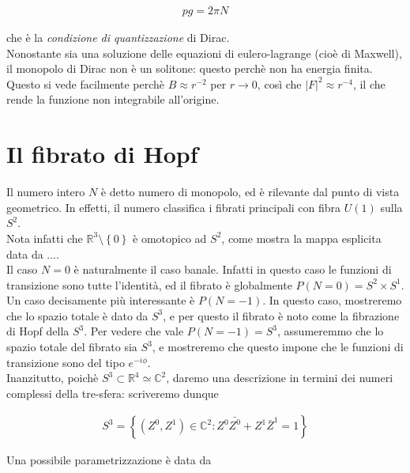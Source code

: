 \documentclass{report}
\begin{document}
\begin{align}
    pg = 2\pi N
\end{align}

che è la \emph{condizione di quantizzazione} di Dirac. \\

Nonostante sia una soluzione delle equazioni di eulero-lagrange (cioè di Maxwell), il monopolo di Dirac non è un solitone: questo perchè non ha energia finita. Questo si vede facilmente perchè \(B \approx r^{-2}\) per \(r \rightarrow 0\), così che \(|F|^2 \approx r^{-4}\), il che rende la funzione non integrabile all'origine. 

\section{Il fibrato di Hopf}

Il numero intero \(N\) è detto numero di monopolo, ed è rilevante dal punto di vista geometrico. In effetti, il numero classifica i fibrati principali con fibra \(U(1)\) sulla \(S^2\). \\

Nota infatti che \(\mathbb{R}^3 \setminus \left\{0\right\}\) è omotopico ad \(S^2\), come mostra la mappa esplicita data da .... \\

Il caso \(N=0\) è naturalmente il caso banale. Infatti in questo caso le funzioni di transizione sono tutte l'identità, ed il fibrato è globalmente \(P(N=0) = S^2 \times S^1\). \\ 

Un caso decisamente più interessante è \(P(N=-1)\). In questo caso, mostreremo che lo spazio totale è dato da  \(S^3\), e per questo il fibrato è noto come la fibrazione di Hopf della \(S^3\). Per vedere che vale \(P(N=-1) = S^3\), assumeremmo che lo spazio totale del fibrato sia \(S^3\), e mostreremo che questo impone che le funzioni di transizione sono del tipo \(e^{-i\phi}\). \\

Inanzitutto, poichè \(S^3 \subset \mathbb{R}^4 \simeq \mathbb{C}^2\), daremo una descrizione in termini dei numeri complessi della tre-sfera: scriveremo dunque 

\begin{align}
    S^3 = \left\{(Z^0, Z^1)\in \mathbb{C}^2 : Z^0 \bar{Z^0} + Z^1\bar{Z}^1 = 1\right\}
\end{align}

Una possibile parametrizzazione è data da 
\end{document}
